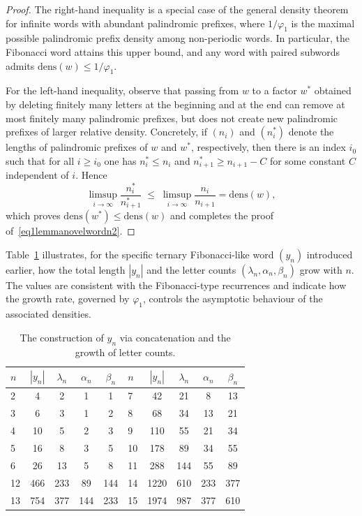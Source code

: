 \documentclass[12pt]{amsart}
\begin{document}
\begin{proof}
The right-hand inequality is a special case of the general density theorem for infinite words with abundant palindromic prefixes, where $1/\varphi_1$ is the maximal possible palindromic prefix density among non-periodic words. In particular, the Fibonacci word attains this upper bound, and any word with paired subwords admits $\mathrm{dens}(w)\le 1/\varphi_1$.

For the left-hand inequality, observe that passing from $w$ to a factor $w^*$ obtained by deleting finitely many letters at the beginning and at the end can remove at most finitely many palindromic prefixes, but does not create new palindromic prefixes of larger relative density. Concretely, if $(n_i)$ and $(n_i^*)$ denote the lengths of palindromic prefixes of $w$ and $w^*$, respectively, then there is an index $i_0$ such that for all $i\ge i_0$ one has $n_i^*\le n_i$ and $n_{i+1}^*\ge n_{i+1}-C$ for some constant $C$ independent of $i$. Hence
\[
\limsup_{i\to\infty} \frac{n_i^*}{n_{i+1}^*}
\;\leqslant\;
\limsup_{i\to\infty} \frac{n_i}{n_{i+1}}
=
\mathrm{dens}(w),
\]
which proves $\mathrm{dens}(w^*)\le \mathrm{dens}(w)$ and completes the proof of~\eqref{eq1lemmanovelwordn2}.
\end{proof}

Table~\ref{tab001efffvbn1} illustrates, for the specific ternary Fibonacci-like word $(y_n)$ introduced earlier, how the total length $|y_n|$ and the letter counts $(\lambda_n,\alpha_n,\beta_n)$ grow with $n$. The values are consistent with the Fibonacci-type recurrences and indicate how the growth rate, governed by $\varphi_1$, controls the asymptotic behaviour of the associated densities.

\begin{table}[H]
    \centering
 \begin{tabular}{|l|c|c|c|c||l|c|c|c|c|}
 \hline
$n$ & $|y_n|$ & $\lambda_n$ & $\alpha_n$ & $\beta_n$ & $n$ & $|y_n|$ & $\lambda_n$ & $\alpha_n$ & $\beta_n$ \\ \hline\hline
2 & 4   & 2   & 1   & 1   & 7  & 42   & 21  & 8   & 13  \\ \hline
3 & 6   & 3   & 1   & 2   & 8  & 68   & 34  & 13  & 21  \\ \hline
4 & 10  & 5   & 2   & 3   & 9  & 110  & 55  & 21  & 34  \\ \hline
5 & 16  & 8   & 3   & 5   & 10 & 178  & 89  & 34  & 55  \\ \hline
6 & 26  & 13  & 5   & 8   & 11 & 288  & 144 & 55  & 89  \\ \hline
12& 466 & 233 & 89  & 144 & 14 & 1220 & 610 & 233 & 377 \\ \hline
13& 754 & 377 & 144 & 233 & 15 & 1974 & 987 & 377 & 610 \\ \hline
\end{tabular}
\caption{The construction of $y_n$ via concatenation and the growth of letter counts.}
\label{tab001efffvbn1}
\end{table}
\end{document}
